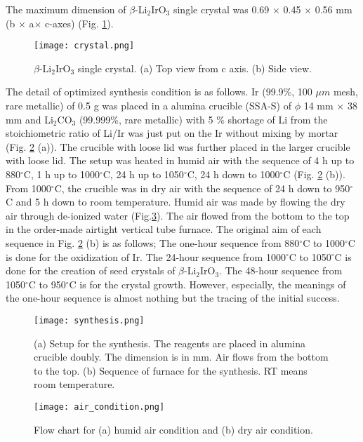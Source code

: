The maximum dimension of $\beta$-Li$_2$IrO$_3$ single crystal was 0.69 $\times$ 0.45 $\times$ 0.56 mm (b $\times$ a$\times$ c-axes) (Fig. \ref{crystal}).

\begin{figure}
  \centering
  \texttt{[image: crystal.png]}
  \caption{$\beta$-Li$_2$IrO$_3$ single crystal.
  (a) Top view from c axis.
  (b) Side view.}
  \label{crystal}
\end{figure}

The detail of optimized synthesis condition is as follows.
Ir (99.9\%, 100 $\mu m$ mesh, rare metallic) of 0.5 g was placed in a alumina crucible (SSA-S) of $\phi$ 14 mm $\times$ 38 mm and
Li$_2$CO$_3$ (99.999\%, rare metallic) with 5 \% shortage of Li from the stoichiometric ratio of Li/Ir
was just put on the Ir without mixing by mortar (Fig. \ref{synthesis} (a)).
The crucible with loose lid was further placed in the larger crucible with loose lid.
The setup was heated in humid air with the sequence of
4 h up to 880$^\circ$C, 1 h up to 1000$^\circ$C, 24 h up to 1050$^\circ$C, 24 h down to 1000$^\circ$C (Fig. \ref{synthesis} (b)).
From 1000$^\circ$C, the crucible was in dry air with the sequence of 24 h down to 950$^\circ$C and 5 h down to room temperature.
Humid air was made by flowing the dry air through de-ionized water (Fig.\ref{flow}).
The air flowed from the bottom to the top in the order-made airtight vertical tube furnace.
The original aim of each sequence in Fig. \ref{synthesis} (b) is as follows;
The one-hour sequence from 880$^\circ$C to 1000$^\circ$C is done for the oxidization of Ir.
The 24-hour sequence from 1000$^\circ$C to 1050$^\circ$C is done for the creation of seed crystals of $\beta$-Li$_2$IrO$_3$.
The 48-hour sequence from 1050$^\circ$C to 950$^\circ$C is for the crystal growth.
However, especially, the meanings of the one-hour sequence is almost nothing but the tracing of the initial success.

\begin{figure}
  \centering
  \texttt{[image: synthesis.png]}
  \caption{(a) Setup for the synthesis.
  The reagents are placed in alumina crucible doubly.
  The dimension is in mm.
  Air flows from the bottom to the top.
  (b) Sequence of furnace for the synthesis.
  RT means room temperature.}
  \label{synthesis}
\end{figure}

\begin{figure}
  \centering
  \texttt{[image: air\_condition.png]}
  \caption{Flow chart for (a) humid air condition
  and (b) dry air condition.}
  \label{flow}
\end{figure}

